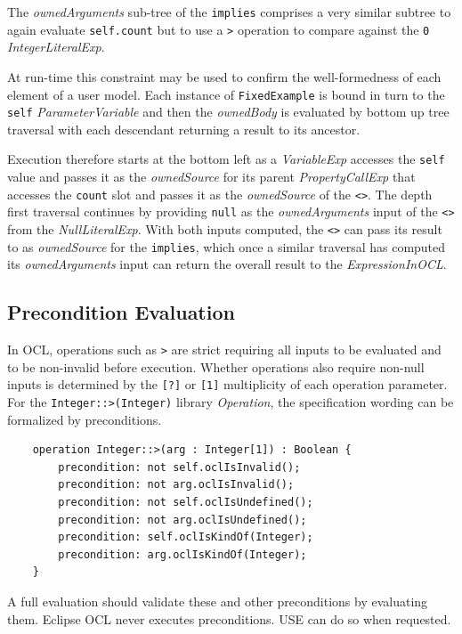 \documentclass{llncs}
\begin{document}
The \emph{ownedArguments} sub-tree of the \verb|implies| comprises a very similar subtree to again evaluate \verb|self.count| but to use a \verb|>| operation to compare against the \verb|0| \emph{IntegerLiteralExp}.

At run-time this constraint may be used to confirm the well-formedness of each element of a user model. Each instance of \verb|FixedExample| is bound in turn to the \verb|self| \emph{ParameterVariable} and then the \emph{ownedBody} is evaluated by bottom up tree traversal with each descendant returning a result to its ancestor.

Execution therefore starts at the bottom left as a \emph{VariableExp} accesses the \verb|self| value and passes it as the \emph{ownedSource} for its parent \emph{PropertyCallExp} that accesses the \verb|count| slot and passes it as the \emph{ownedSource} of the \verb|<>|. The depth first traversal continues by providing \verb|null| as the \emph{ownedArguments} input of the \verb|<>| from the \emph{NullLiteralExp}. With both inputs computed, the \verb|<>| can pass its result to as  \emph{ownedSource} for the \verb|implies|, which once a similar traversal has computed its \emph{ownedArguments} input can return the overall result to the \emph{ExpressionInOCL}.

\subsection{Precondition Evaluation}\label{Precondition Evaluation}

In OCL, operations such as \verb|>| are strict requiring all inputs to be evaluated and to be non-invalid before execution. Whether operations also require non-null inputs is determined by the \verb|[?]| or \verb|[1]| multiplicity of each operation parameter. For the \verb|Integer::>(Integer)| library \emph{Operation}, the specification wording can be formalized by preconditions.

\begin{verbatim}
    operation Integer::>(arg : Integer[1]) : Boolean {
        precondition: not self.oclIsInvalid();
        precondition: not arg.oclIsInvalid();
        precondition: not self.oclIsUndefined();
        precondition: not arg.oclIsUndefined();
        precondition: self.oclIsKindOf(Integer);
        precondition: arg.oclIsKindOf(Integer);
    }
\end{verbatim}

A full evaluation should validate these and other preconditions by evaluating them. Eclipse OCL\cite{Eclipse-OCL} never executes preconditions. USE \cite{USE}can do so when requested.
\end{document}
